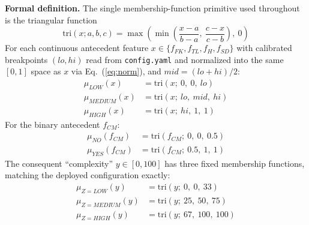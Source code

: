 \documentclass[conference]{IEEEtran}
\begin{document}
\textbf{Formal definition.} The single membership-function primitive used
throughout is the triangular function
\begin{equation}
\mathrm{tri}(x; a, b, c) = \max\!\left(\min\!\left(\frac{x-a}{b-a},\ \frac{c-x}{c-b}\right),\ 0\right)
\label{eq:tri}
\end{equation}
For each continuous antecedent feature $x \in \{f_{FK}, f_{TL}, f_H,
f_{SD}\}$ with calibrated breakpoints $(lo, hi)$ read from
\texttt{config.yaml} and normalized into the same $[0,1]$ space as $x$
via Eq.~(\ref{eq:norm}), and $mid = (lo+hi)/2$:
\begin{align}
\mu_{LOW}(x) &= \mathrm{tri}(x;\ 0,\ 0,\ lo) \label{eq:mulow}\\
\mu_{MEDIUM}(x) &= \mathrm{tri}(x;\ lo,\ mid,\ hi) \label{eq:mumed}\\
\mu_{HIGH}(x) &= \mathrm{tri}(x;\ hi,\ 1,\ 1) \label{eq:muhigh}
\end{align}
For the binary antecedent $f_{CM}$:
\begin{align}
\mu_{NO}(f_{CM}) &= \mathrm{tri}(f_{CM};\ 0,\ 0,\ 0.5) \label{eq:muno}\\
\mu_{YES}(f_{CM}) &= \mathrm{tri}(f_{CM};\ 0.5,\ 1,\ 1) \label{eq:muyes}
\end{align}
The consequent ``complexity'' $y \in [0,100]$ has three fixed membership
functions, matching the deployed configuration exactly:
\begin{align}
\mu_{Z=LOW}(y) &= \mathrm{tri}(y;\ 0,\ 0,\ 33) \label{eq:zlow}\\
\mu_{Z=MEDIUM}(y) &= \mathrm{tri}(y;\ 25,\ 50,\ 75) \label{eq:zmed}\\
\mu_{Z=HIGH}(y) &= \mathrm{tri}(y;\ 67,\ 100,\ 100) \label{eq:zhigh}
\end{align}
\end{document}
